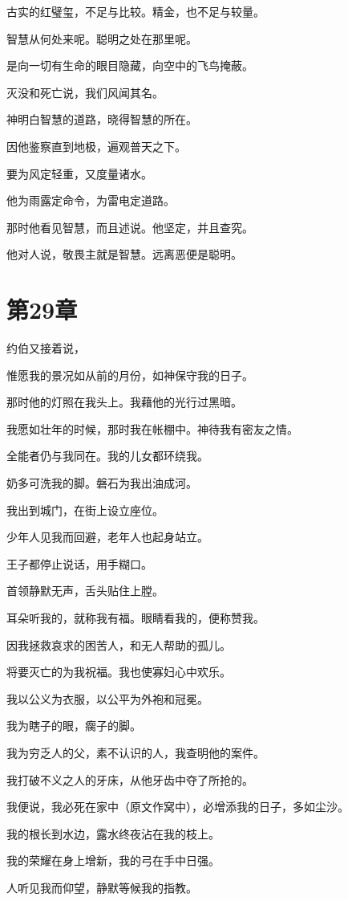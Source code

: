 \documentclass[12pt,oneside]{book}
\begin{document}
古实的红璧玺，不足与比较。精金，也不足与较量。

智慧从何处来呢。聪明之处在那里呢。

是向一切有生命的眼目隐藏，向空中的飞鸟掩蔽。

灭没和死亡说，我们风闻其名。

神明白智慧的道路，晓得智慧的所在。

因他鉴察直到地极，遍观普天之下。

要为风定轻重，又度量诸水。

他为雨露定命令，为雷电定道路。

那时他看见智慧，而且述说。他坚定，并且查究。

他对人说，敬畏主就是智慧。远离恶便是聪明。


\chapter{第29章}
约伯又接着说，

惟愿我的景况如从前的月份，如神保守我的日子。

那时他的灯照在我头上。我藉他的光行过黑暗。

我愿如壮年的时候，那时我在帐棚中。神待我有密友之情。

全能者仍与我同在。我的儿女都环绕我。

奶多可洗我的脚。磐石为我出油成河。

我出到城门，在街上设立座位。

少年人见我而回避，老年人也起身站立。

王子都停止说话，用手糊口。

首领静默无声，舌头贴住上膛。

耳朵听我的，就称我有福。眼睛看我的，便称赞我。

因我拯救哀求的困苦人，和无人帮助的孤儿。

将要灭亡的为我祝福。我也使寡妇心中欢乐。

我以公义为衣服，以公平为外袍和冠冕。

我为瞎子的眼，瘸子的脚。

我为穷乏人的父，素不认识的人，我查明他的案件。

我打破不义之人的牙床，从他牙齿中夺了所抢的。

我便说，我必死在家中（原文作窝中），必增添我的日子，多如尘沙。

我的根长到水边，露水终夜沾在我的枝上。

我的荣耀在身上增新，我的弓在手中日强。

人听见我而仰望，静默等候我的指教。
\end{document}
